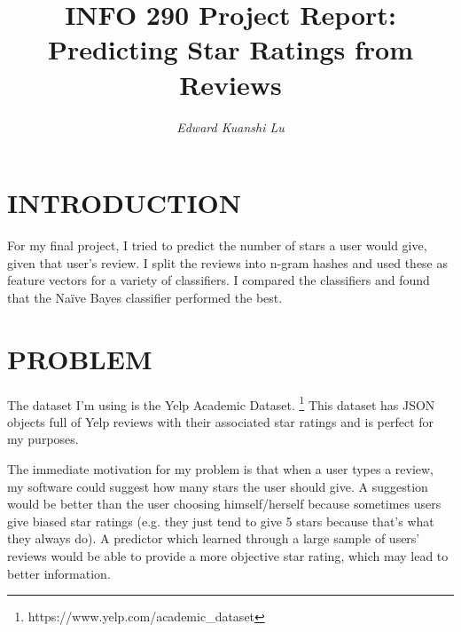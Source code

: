 \documentclass[11pt, onecolumn]{IEEEtran}
\begin{document}


\title{INFO 290 Project Report: Predicting Star Ratings from Reviews}


\author{
\parbox[t]{9cm}{\centering
	     {\em Edward Kuanshi Lu}\\}
}

\maketitle


\section{INTRODUCTION}
For my final project, I tried to predict the number of stars a user would give, given that user's review. I split the reviews into n-gram hashes and used these as feature vectors for a variety of classifiers. I compared the classifiers and found that the Na\"{i}ve Bayes classifier performed the best.


\section{PROBLEM}
The dataset I'm using is the Yelp Academic Dataset. \footnote{https://www.yelp.com/academic\_dataset} This dataset has JSON objects full of Yelp reviews with their associated star ratings and is perfect for my purposes.

The immediate motivation for my problem is that when a user types a review, my software could suggest how many stars the user should give. A suggestion would be better than the user choosing himself/herself because sometimes users give biased star ratings (e.g. they just tend to give 5 stars because that's what they always do). A predictor which learned through a large sample of users' reviews would be able to provide a more objective star rating, which may lead to better information.
\end{document}
